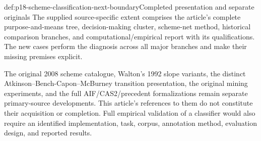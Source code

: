 \begin{proofboundary}{def:p18-scheme-classification-next-boundary}{Completed presentation and separate originals}
The supplied source-specific extent comprises the article's complete
purpose-and-means tree, decision-making cluster, scheme-net method,
historical comparison branches, and computational/empirical report
with its qualifications. The new cases perform the diagnosis
across all major branches and make their missing premises explicit.

The original 2008 scheme catalogue, Walton's 1992 slope variants,
the distinct Atkinson--Bench-Capon--McBurney transition presentation,
the original mining experiments, and the full AIF/CAS2/precedent
formalizations remain separate primary-source developments.
This article's references to them do not constitute their acquisition
or completion. Full empirical validation of a classifier would
also require an identified implementation, task, corpus,
annotation method, evaluation design, and reported results.
\end{proofboundary}
